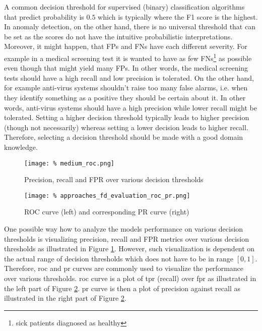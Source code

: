 A common decision threshold for supervised (binary) classification algorithms that predict probability is $0.5$ \cite{chen2006decision} which is typically where the F1 score is the highest.
In anomaly detection, on the other hand, there is no universal threshold that can be set as the scores do not have the intuitive probabilistic interpretations.
Moreover, it might happen, that FPs and FNs have each different severity.
For example in a medical screening test it is wanted to have as few FNs\footnote{sick patients diagnosed as healthy} as possible even though that might yield many FPs.
In other words, the medical screening tests should have a high recall and low precision is tolerated.
On the other hand, for example anti-virus systems shouldn't raise too many false alarms, i.e. when they identify something as a positive they should be certain about it.
In other words, anti-virus systems should have a high precision while lower recall might be tolerated.
Setting a higher decision threshold typically leads to higher precision (though not necessarily) whereas setting a lower decision leads to higher recall.
Therefore, selecting a decision threshold should be made with a good domain knowledge.

\begin{figure}
    \texttt{[image: \%
        medium\_roc.png]}
    \caption{Precision, recall and FPR over various decision thresholds}
    \label{fig:ml_decision}
    \centering
\end{figure}

\begin{figure}
    \texttt{[image: \%
        approaches\_fd\_evaluation\_roc\_pr.png]}
    \caption{ROC curve (left) and corresponding PR curve (right) \cite{flach2015precision}}
    \label{fig:ml_roc_pr}
    \centering
\end{figure}

One possible way how to analyze the models performance on various decision thresholds is visualizing precision, recall and FPR metrics over various decision thresholds as illustrated in Figure \ref{fig:ml_decision}.
However, such visualization is dependent on the actual range of decision thresholds which does not have to be in range $[0, 1]$.
Therefore, \acrfull{roc} and \acrfull{pr} curves are commonly used to visualize the performance over various thresholds.
\Acrshort{roc} curve is a plot of \acrshort{tpr} (recall) over \acrshort{fpr} as illustrated in the left part of Figure \ref{fig:ml_roc_pr}.
\Acrshort{pr} curve is then a plot of precision against recall as illustrated in the right part of Figure \ref{fig:ml_roc_pr}.

